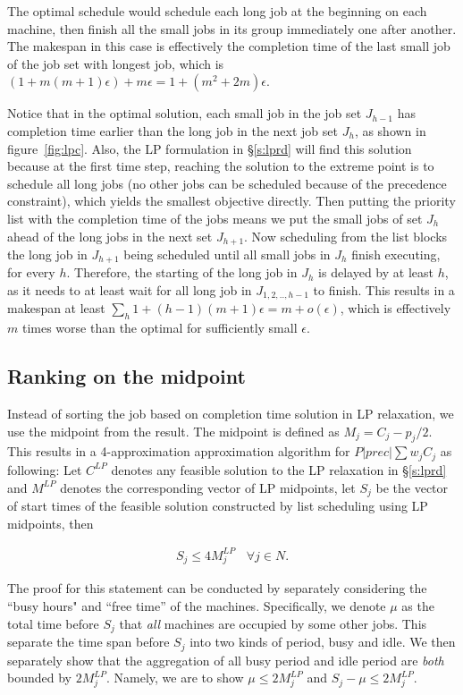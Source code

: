 The optimal schedule would schedule each long job at the beginning on each machine, then finish all the small jobs in its group immediately one after another. The makespan in this case is effectively the completion time of the last small job of the job set with longest job, which is $(1 + m(m+1)\epsilon) + m\epsilon = 1 +(m^2+2m)\epsilon$. 

Notice that in the optimal solution, each small job in the job set $J_{h-1}$ has completion time earlier than the long job in the next job set $J_h$, as shown in figure~\ref{fig:lpc}. Also, the LP formulation in \S\ref{s:lprd} will find this solution because at the first time step, reaching the solution to the extreme point is to schedule all long jobs (no other jobs can be scheduled because of the precedence constraint), which yields the smallest objective directly. Then putting the priority list with the completion time of the jobs means we put the small jobs of set $J_h$ ahead of the long jobs in the next set $J_{h+1}$. Now scheduling from the list blocks the long job in $J_{h+1}$ being scheduled until all small jobs in $J_h$ finish executing, for every $h$. Therefore, the starting of the long job in $J_h$ is delayed by at least $h$, as it needs to at least wait for all long job in $J_{1, 2,.., h-1}$ to finish. This results in a makespan at least $\sum_h 1 + (h-1)(m+1)\epsilon = m + o(\epsilon)$, which is effectively $m$ times worse than the optimal for sufficiently small $\epsilon$.

\subsection{Ranking on the midpoint} \label{s:lpm}
Instead of sorting the job based on completion time solution in LP relaxation, we use the midpoint from the result. The midpoint is defined as $M_j = C_j - p_j/2$. This results in a 4-approximation approximation algorithm for $P|prec|\sum w_jC_j$ as following: Let $C^{LP}$ denotes any feasible solution to the LP relaxation in \S\ref{s:lprd} and $M^{LP}$ denotes the corresponding vector of LP midpoints, let $S_j$ be the vector of start times of the feasible solution constructed by list scheduling using LP midpoints, then

\begin{align}
S_j \leq 4 M^{LP}_j \:\:\:\: \forall j \in N.
\end{align}

The proof for this statement can be conducted by separately considering the ``busy hours" and ``free time'' of the machines. Specifically, we denote $\mu$ as the total time before $S_j$ that \emph{all} machines are occupied by some other jobs. This separate the time span before $S_j$ into two kinds of period, busy and idle. We then separately show that the aggregation of all busy period and idle period are \emph{both} bounded by $2M^{LP}_j$. Namely, we are to show $\mu \leq 2 M^{LP}_j$ and  $S_j - \mu \leq 2 M^{LP}_j$.

